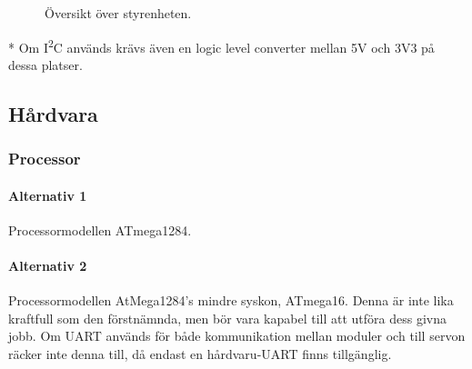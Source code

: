 \documentclass[a4paper,11pt]{article}
\begin{document}
\begin{figure}[h!]
    \caption{Översikt över styrenheten.}
    \label{fig:unitMotorcontroller}
\end{figure}
\noindent \begin{small}
    * Om I\textsuperscript{2}C används krävs även en logic level converter mellan 5V och 3V3 på dessa platser.
\end{small}
\subsection{Hårdvara}

\subsubsection{Processor}

\paragraph{Alternativ 1}
Processormodellen ATmega1284.

\paragraph{Alternativ 2}
Processormodellen AtMega1284's mindre syskon, ATmega16. Denna är inte lika kraftfull som den förstnämnda, men bör vara kapabel till att utföra dess givna jobb. Om UART används för både kommunikation mellan moduler och till servon räcker inte denna till, då endast en hårdvaru-UART finns tillgänglig.
\end{document}
